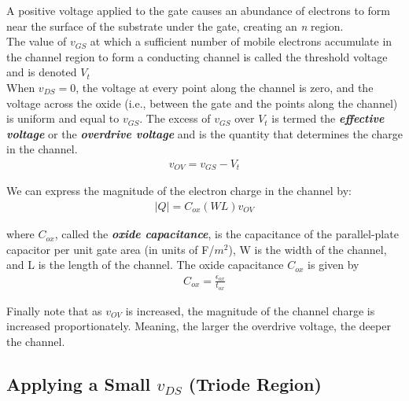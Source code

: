 \documentclass[12pt]{article}
\begin{document}
    A positive voltage applied to the gate causes an abundance of electrons to form near the surface 
    of the substrate under the gate, creating an \textit{n} region.\\[\baselineskip]
    The value of $v_{GS}$ at which a sufficient number of mobile electrons 
    accumulate in the channel region to form a conducting channel is called 
    the threshold voltage and is denoted $V_t$\\
    When $v_{DS} = 0$, the voltage at every point along the channel is zero, 
    and the voltage across the oxide (i.e., between the gate and the points along 
    the channel) is uniform and equal to $v_{GS}$. The excess of $v_{GS}$ over $V_t$ is
    termed the \textit{\textbf{effective voltage}} or the \textit{\textbf{overdrive voltage}} 
    and is the quantity that determines the charge in the channel.
    \begin{align}
        v_{OV} = v_{GS} - V_t
    \end{align}

    We can express the magnitude of the electron charge in the channel by:
    \begin{align}
        |Q| = C_{ox}(WL)v_{OV}
    \end{align}

    where $C_{ox}$, called the \textit{\textbf{oxide capacitance}}, is the capacitance of the 
    parallel-plate capacitor per unit gate area (in units of F/$m^2$), W is the width of the channel, 
    and L is the length of the channel. The oxide capacitance $C_{ox}$ is given by
    \begin{align}
        C_{ox} = \frac{\epsilon_{ox}}{t_{ox}}
    \end{align}

    Finally note that as $v_{OV}$ is increased, the magnitude of the channel charge is 
    increased proportionately. Meaning, the larger the overdrive voltage, the
    deeper the channel.

    \subsection*{Applying a Small $v_{DS}$ (Triode Region)}
\end{document}
